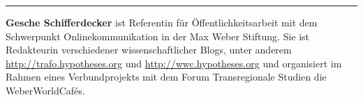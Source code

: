 \begin{center}\rule{0.5\linewidth}{\linethickness}\end{center}

\textbf{Gesche Schifferdecker} ist Referentin für Öffentlichkeitsarbeit
mit dem Schwerpunkt Onlinekommunikation in der Max Weber Stiftung. Sie
ist Redakteurin verschiedener wissenschaftlicher Blogs, unter anderem
\url{http://trafo.hypotheses.org} und \url{http://wwc.hypotheses.org}
und organisiert im Rahmen eines Verbundprojekts mit dem Forum
Transregionale Studien die WeberWorldCafés.
